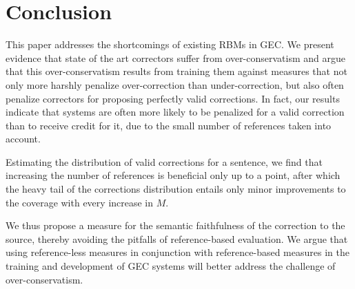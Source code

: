 \documentclass[letterpaper, 11pt]{article}
\begin{document}
%
%
%
\section{Conclusion}

This paper addresses the shortcomings of existing RBMs in GEC.
We present evidence that state of the art correctors suffer from over-conservatism and
argue that this over-conservatism results from training them against measures that
not only more harshly penalize over-correction than under-correction,
but also often penalize correctors for proposing perfectly valid corrections.
In fact, our results indicate that systems are often more likely to be penalized for a valid correction
than to receive credit for it, due to the small number of references taken into account.

Estimating the distribution of valid corrections for a sentence, we find
that increasing the number of references is beneficial only up to a point, after which
the heavy tail of the corrections distribution entails only minor improvements to the coverage
with every increase in $M$.

We thus propose a measure for the semantic faithfulness of the correction to the source,
thereby avoiding the pitfalls of reference-based evaluation. We argue that using reference-less
measures in conjunction with reference-based measures in the training and development of GEC
systems will better address the challenge of over-conservatism.
\end{document}
